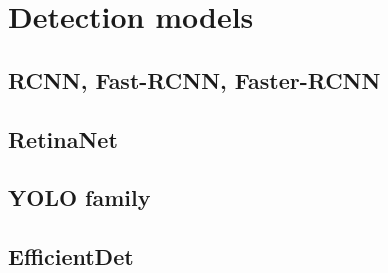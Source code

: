 \section{Detection models}

\subsection{RCNN, Fast-RCNN, Faster-RCNN}

\subsection{RetinaNet}

\subsection{YOLO family}

\subsection{EfficientDet}